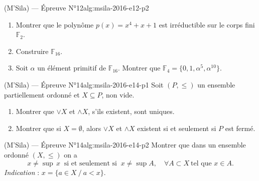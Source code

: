 \newpage

\begin{problem}{(M'Sila) — Épreuve N°12}{alg:msila-2016-e12-p2}
\begin{enumerate}
\item Montrer que le polynôme $p(x) = x^4 + x + 1$ est irréductible sur le corps
      fini $\mathbb{F}_2$.
\item Construire $\mathbb{F}_{16}$.
\item Soit $\alpha$ un élément primitif de $\mathbb{F}_{16}$. Montrer que
      $\mathbb{F}_4 = \{0, 1, \alpha^5, \alpha^{10}\}$.
\end{enumerate}

\end{problem}

\newpage

\begin{problem}{(M'Sila) — Épreuve N°14}{alg:msila-2016-e14-p1}
Soit $(P, \le)$ un ensemble partiellement ordonné et $X \subseteq P$, non vide.
\begin{enumerate}
\item Montrer que $\vee X$ et $\wedge X$, s'ils existent, sont uniques.
\item Montrer que si $X = \emptyset$, alors $\vee X$ et $\wedge X$ existent si et
      seulement si $P$ est fermé.
\end{enumerate}

\end{problem}

\newpage

\begin{problem}{(M'Sila) — Épreuve N°14}{alg:msila-2016-e14-p2}
Montrer que dans un ensemble ordonné $(X, \le)$ on a
$$
x \ne \sup\, x\ \text{ si et seulement si } \ x \ne \sup A, \quad \forall A \subset X \ \text{tel que } x \in A.
$$
\emph{Indication} : $x = \{a \in X \ / \ a < x\}$.

\end{problem}

\newpage

